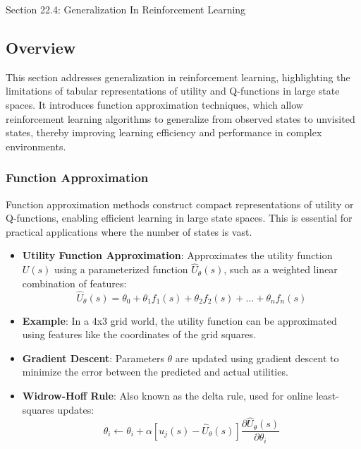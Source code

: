 \begin{notes}{Section 22.4: Generalization In Reinforcement Learning}
    \subsection*{Overview}

    This section addresses generalization in reinforcement learning, highlighting the limitations of tabular representations of utility and Q-functions in large state spaces. It introduces function 
    approximation techniques, which allow reinforcement learning algorithms to generalize from observed states to unvisited states, thereby improving learning efficiency and performance in complex environments.
    
    \subsubsection*{Function Approximation}
    
    Function approximation methods construct compact representations of utility or Q-functions, enabling efficient learning in large state spaces. This is essential for practical applications where the 
    number of states is vast.
    
    \begin{highlight}
    
        \begin{itemize}
            \item \textbf{Utility Function Approximation}: Approximates the utility function $U(s)$ using a parameterized function $\hat{U}_\theta(s)$, such as a weighted linear combination of features:
            \[
            \hat{U}_\theta(s) = \theta_0 + \theta_1 f_1(s) + \theta_2 f_2(s) + \ldots + \theta_n f_n(s)
            \]
            \item \textbf{Example}: In a 4x3 grid world, the utility function can be approximated using features like the coordinates of the grid squares.
            \item \textbf{Gradient Descent}: Parameters $\theta$ are updated using gradient descent to minimize the error between the predicted and actual utilities.
            \item \textbf{Widrow-Hoff Rule}: Also known as the delta rule, used for online least-squares updates:
            \[
            \theta_i \leftarrow \theta_i + \alpha [u_j(s) - \hat{U}_\theta(s)] \frac{\partial \hat{U}_\theta(s)}{\partial \theta_i}
            \]
        \end{itemize}
    

\end{highlight}
\end{notes}
